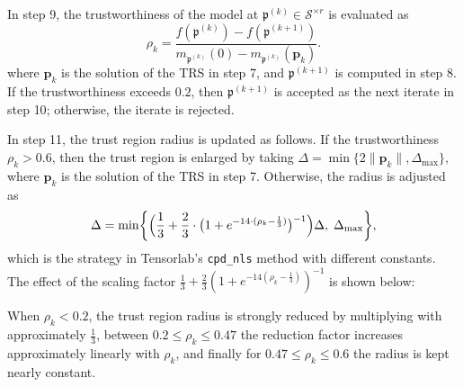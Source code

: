 \documentclass[a4paper,10pt,final]{siamart1116}
\newcommand{\tuple}[1]{\mathfrak{#1}}
\newcommand{\Var}[1]{\mathcal{#1}}
\newcommand{\vect}[1]{\mathbf{#1}}
\numberwithin{equation}{section}
\numberwithin{figure}{section}
\numberwithin{table}{section}
\numberwithin{theorem}{section}
\begin{document}
In step {9}, the trustworthiness of the model at $\tuple{p}^{(k)} \in \Var{S}^{\times r}$ is evaluated as
\[
 \rho_{k} = \frac{f(\tuple{p}^{(k)}) - f(\tuple{p}^{(k+1)})}{m_{\tuple{p}^{(k)}}(0) - m_{\tuple{p}^{(k)}}(\vect{p}_k)}.
\]
where $\vect{p}_k$ is the solution of the TRS in step {7}, and $\tuple{p}^{(k+1)}$ is computed in step {8}.
If the trustworthiness exceeds $0.2$, then $\tuple{p}^{(k+1)}$ is accepted as the next iterate in step {10}; otherwise, the iterate is rejected.

In step 11, the trust region radius is updated as follows. If the trustworthiness $\rho_k > 0.6$, then the trust region is enlarged by taking
\(
 \Delta = \min\{ 2 \|\vect{p}_k\|, \Delta_{\max} \},
\)
where $\vect{p}_k$ is the solution of the TRS in step {7}. Otherwise, the radius is adjusted as
\[
 \Delta = \min \biggl\{ \Bigl( \frac{1}{3} + \frac{2}{3} \cdot \bigl(1 + e^{-14\cdot(\rho_k - \frac{1}{3})} \bigr)^{-1} \Bigr) \Delta,\; \Delta_{\max} \biggr\},
\]
which is the strategy in Tensorlab's \texttt{cpd\_nls} method \cite{Tensorlab} with different constants. The effect of the scaling factor $\tfrac{1}{3} + \tfrac{2}{3} (1 + e^{-14(\rho_k-\frac{1}{3})})^{-1}$ is shown below:
\begin{center}
\end{center}
When $\rho_k < 0.2$, the trust region radius is strongly reduced by multiplying with approximately $\tfrac{1}{3}$, between $0.2 \le \rho_k \le 0.47$ the reduction factor increases approximately linearly with $\rho_k$, and finally for $0.47 \le \rho_k \le 0.6$ the radius is kept nearly constant.
\end{document}
